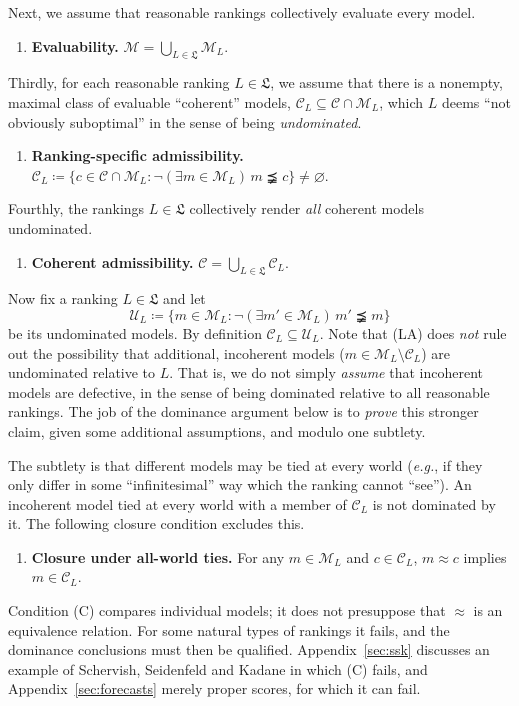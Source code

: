 \documentclass[11pt]{article}
\theoremstyle{definition}
\theoremstyle{remark}
\newcommand{\M}{\mathcal M}
\newcommand{\C}{\mathcal C}
\newcommand{\U}{\mathcal U}
\begin{document}
Next, we assume that reasonable rankings collectively evaluate every model.
\begin{enumerate}[label=\textbf{(E)},leftmargin=*]
\item \textbf{Evaluability.} $\M=\bigcup_{L\in\mathfrak L}\M_L$.
\end{enumerate}

Thirdly, for each reasonable ranking $L\in\mathfrak L$, we assume that there is a nonempty, maximal class of evaluable ``coherent'' models, $\C_L\subseteq\C\cap\M_L$, which $L$ deems ``not obviously suboptimal'' in the sense of being \textit{undominated}.
\begin{enumerate}[label=\textbf{(LA)},leftmargin=*]
\item \textbf{Ranking-specific admissibility.} $\C_L\coloneqq \{c\in\C\cap\M_L : \neg(\exists m\in\M_L)\,m\precneqq c\}\neq\varnothing$.
\end{enumerate}

Fourthly, the rankings $L\in\mathfrak L$ collectively render \textit{all} coherent models undominated.
\begin{enumerate}[label=\textbf{(A)},leftmargin=*]
\item \textbf{Coherent admissibility.} $\C=\bigcup_{L\in\mathfrak L}\C_L$.
\end{enumerate}

Now fix a ranking $L\in\mathfrak L$ and let
\[
 \U_L\coloneqq \{m\in\M_L:\neg(\exists m'\in\M_L)\,m'\precneqq m\}
\]
be its undominated models. By definition $\C_L\subseteq\U_L$. Note that (LA) does \textit{not} rule out the possibility that additional, incoherent models ($m\in\M_L\setminus\C_L$) are undominated relative to $L$. That is, we do not simply \textit{assume} that incoherent models are defective, in the sense of being dominated relative to all reasonable rankings. The job of the dominance argument below is to \textit{prove} this stronger claim, given some additional assumptions, and modulo one subtlety.

The subtlety is that different models may be tied at every world (\textit{e.g.}, if they only differ in some ``infinitesimal'' way which the ranking cannot ``see''). An incoherent model tied at every world with a member of $\C_L$ is not dominated by it. The following closure condition excludes this.
\begin{enumerate}[label=\textbf{(C)},leftmargin=*]
\item \textbf{Closure under all-world ties.} For any $m\in \M_L$ and $c\in \C_L$, $m\approx c$ implies $m\in \C_L$.
\end{enumerate}
Condition (C) compares individual models; it does not presuppose that $\approx$ is an equivalence relation. For some natural types of rankings it fails, and the dominance conclusions must then be qualified. Appendix~\ref{sec:ssk} discusses an example of Schervish, Seidenfeld and Kadane in which (C) fails, and Appendix~\ref{sec:forecasts} merely proper scores, for which it can fail.
\end{document}
